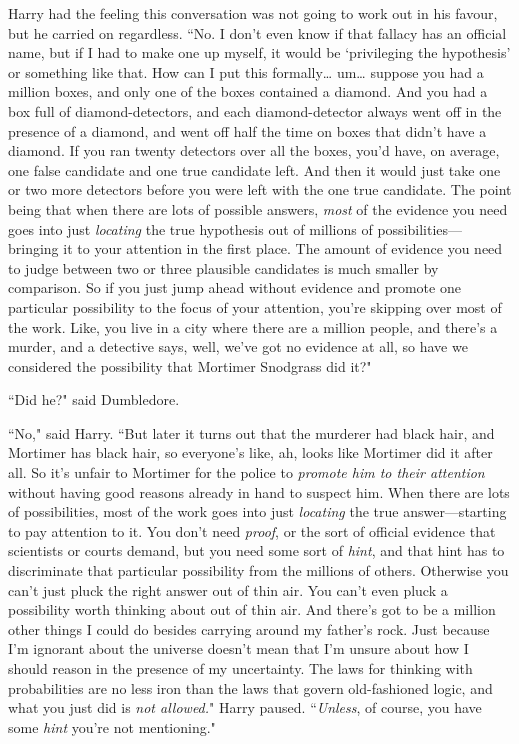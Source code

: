 Harry had the feeling this conversation was not going to work out in his favour, but he carried on regardless. ``No. I don't even know if that fallacy has an official name, but if I had to make one up myself, it would be `privileging the hypothesis' or something like that. How can I put this formally{\ldots} um{\ldots} suppose you had a million boxes, and only one of the boxes contained a diamond. And you had a box full of diamond-detectors, and each diamond-detector always went off in the presence of a diamond, and went off half the time on boxes that didn't have a diamond. If you ran twenty detectors over all the boxes, you'd have, on average, one false candidate and one true candidate left. And then it would just take one or two more detectors before you were left with the one true candidate. The point being that when there are lots of possible answers, \emph{most} of the evidence you need goes into just \emph{locating} the true hypothesis out of millions of possibilities—bringing it to your attention in the first place. The amount of evidence you need to judge between two or three plausible candidates is much smaller by comparison. So if you just jump ahead without evidence and promote one particular possibility to the focus of your attention, you're skipping over most of the work. Like, you live in a city where there are a million people, and there's a murder, and a detective says, well, we've got no evidence at all, so have we considered the possibility that Mortimer Snodgrass did it?"

``Did he?" said Dumbledore.

``No," said Harry. ``But later it turns out that the murderer had black hair, and Mortimer has black hair, so everyone's like, ah, looks like Mortimer did it after all. So it's unfair to Mortimer for the police to \emph{promote him to their attention} without having good reasons already in hand to suspect him. When there are lots of possibilities, most of the work goes into just \emph{locating} the true answer—starting to pay attention to it. You don't need \emph{proof}, or the sort of official evidence that scientists or courts demand, but you need some sort of \emph{hint}, and that hint has to discriminate that particular possibility from the millions of others. Otherwise you can't just pluck the right answer out of thin air. You can't even pluck a possibility worth thinking about out of thin air. And there's got to be a million other things I could do besides carrying around my father's rock. Just because I'm ignorant about the universe doesn't mean that I'm unsure about how I should reason in the presence of my uncertainty. The laws for thinking with probabilities are no less iron than the laws that govern old-fashioned logic, and what you just did is \emph{not allowed.}" Harry paused. ``\emph{Unless}, of course, you have some \emph{hint} you're not mentioning."

